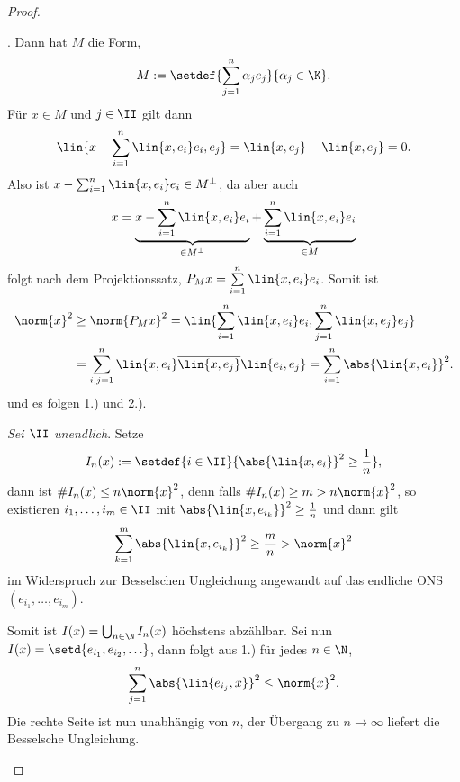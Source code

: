 \begin{proof}
\begin{proofenum}
  \item {}. Dann hat $M$ die Form,
\begin{align*}
M := \setdef{\sum\limits_{j=1}^n \alpha_j e_j}{\alpha_j\in\K}. 
\end{align*} 
Für $x\in M$ und $j\in\II$ gilt dann
\begin{align*}
\lin{x-\sum\limits_{i=1}^n \lin{x,e_i}e_i,e_j} = \lin{x,e_j}- \lin{x,e_j} = 0.
\end{align*}
Also ist $x-\sum_{i=1}^n \lin{x,e_i}e_i\in M^\bot$, da aber auch
\begin{align*}
x = \underbrace{x-\sum\limits_{i=1}^n \lin{x,e_i}e_i}_{\in M^\bot} +
\underbrace{\sum\limits_{i=1}^n \lin{x,e_i}e_i}_{\in M}
\end{align*}
folgt nach dem Projektionssatz, $P_Mx=\sum\limits_{i=1}^n
\lin{x,e_i}e_i$. Somit ist
\begin{align*}
\norm{x}^2 &\ge \norm{P_M x}^2 = \lin{\sum\limits_{i=1}^n
\lin{x,e_i}e_i,\sum\limits_{j=1}^n \lin{x,e_j}e_j}\\
&= \sum\limits_{i,j=1}^n \lin{x,e_i}\overline{\lin{x,e_j}}\lin{e_i,e_j}
= \sum\limits_{i=1}^n \abs{\lin{x,e_i}}^2.
\end{align*}
und es folgen 1.) und 2.).
\item \textit{Sei $\II$ unendlich}. Setze
\begin{align*}
I_n(x) := \setdef{i\in \II}{\abs{\lin{x,e_i}}^2\ge\frac{1}{n}},
\end{align*}
dann ist $\card I_n(x) \le n \norm{x}^2$, denn falls $\card I_n(x)\ge m >
n\norm{x}^2$, so existieren $i_1,\ldots,i_m\in\II$ mit $\abs{\lin{x,e_{i_k}}}^2
\ge \frac{1}{n}$ und dann gilt
\begin{align*}
\sum\limits_{k=1}^m \abs{\lin{x,e_{i_k}}}^2 \ge \frac{m}{n} > \norm{x}^2
\end{align*}
im Widerspruch zur Besselschen Ungleichung angewandt auf das endliche ONS
$(e_{i_1},\ldots,e_{i_m})$.

Somit ist $I(x) = \bigcup_{n\in\N} I_n(x)$ höchstens abzählbar. Sei nun
$I(x)=\setd{e_{i_1},e_{i_2},\ldots}$, dann folgt aus 1.) für jedes
$n\in\N$,
\begin{align*}
\sum\limits_{j=1}^n \abs{\lin{e_{i_j},x}}^2 \le \norm{x}^2.
\end{align*}
Die rechte Seite ist nun unabhängig von $n$, der Übergang zu $n\to\infty$
liefert die Besselsche Ungleichung.


\end{proofenum}
\end{proof}
